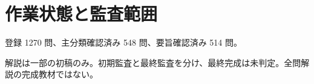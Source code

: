 \chapter{作業状態と監査範囲}
登録 1270 問、主分類確認済み 548 問、要旨確認済み 514 問。
\par 解説は一部の初稿のみ。初期監査と最終監査を分け、最終完成は未判定。全問解説の完成教材ではない。
